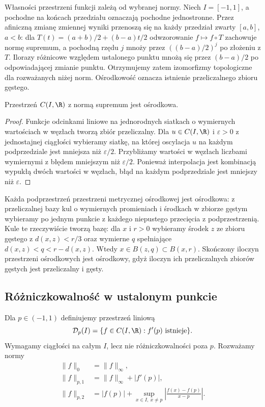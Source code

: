 Własności przestrzeni funkcji zależą od wybranej normy.
Niech $I=[-1,1]$, a pochodne na końcach przedziału
oznaczają pochodne jednostronne. Przez afiniczną zmianę
zmiennej wyniki przenoszą się na każdy przedział
zwarty $[a,b]$, $a<b$: dla
$T(t)=(a+b)/2+(b-a)t/2$ odwzorowanie $f\mapsto f\circ T$
zachowuje normę supremum, a pochodną rzędu $j$
mnoży przez $( (b-a)/2)^j$ po złożeniu z $T$.
Ilorazy różnicowe względem ustalonego punktu
mnożą się przez $(b-a)/2$ po odpowiadającej zmianie
punktu. Otrzymujemy zatem izomorfizmy topologiczne
dla rozważanych niżej norm.
Ośrodkowość oznacza istnienie
przeliczalnego zbioru gęstego.

\begin{lemat}
\label{ma2:lem:continuous-separable}
Przestrzeń $C(I,\R)$ z normą supremum jest ośrodkowa.
\end{lemat}
\begin{proof}
Funkcje odcinkami liniowe na jednorodnych siatkach
o wymiernych wartościach w węzłach tworzą zbiór
przeliczalny. Dla $u\in C(I,\R)$ i $\varepsilon>0$
z jednostajnej ciągłości wybieramy siatkę, na której
oscylacja $u$ na każdym podprzedziale jest mniejsza
niż $\varepsilon/2$. Przybliżamy wartości w węzłach
liczbami wymiernymi z błędem mniejszym niż
$\varepsilon/2$. Ponieważ interpolacja jest kombinacją
wypukłą dwóch wartości w węzłach, błąd na każdym
podprzedziale jest mniejszy niż $\varepsilon$.
\end{proof}

Każda podprzestrzeń przestrzeni metrycznej ośrodkowej
jest ośrodkowa: z przeliczalnej bazy kul o wymiernych
promieniach i środkach w zbiorze gęstym wybieramy po
jednym punkcie z każdego niepustego przecięcia
z podprzestrzenią. Kule te rzeczywiście tworzą bazę:
dla $x$ i $r>0$ wybieramy środek $z$ ze zbioru gęstego
z $d(x,z)<r/3$ oraz wymierne $q$ spełniające
$d(x,z)<q<r-d(x,z)$. Wtedy $x\in B(z,q)\subset B(x,r)$. Skończony iloczyn przestrzeni
ośrodkowych jest ośrodkowy, gdyż iloczyn ich
przeliczalnych zbiorów gęstych jest przeliczalny i gęsty.

\subsection{Różniczkowalność w ustalonym punkcie}

\begin{definicja}
\label{ma2:def:point-differentiable-space}
Dla $p\in(-1,1)$ definiujemy przestrzeń liniową
\[
 \mathcal D_p(I)=\{f\in C(I,\R):f'(p)\text{ istnieje}\}.
\]
Wymagamy ciągłości na całym $I$, lecz nie
różniczkowalności poza $p$. Rozważamy normy
\[
 \begin{aligned}
 \|f\|_0&=\|f\|_\infty,\\
 \|f\|_{p,1}&=\|f\|_\infty+|f'(p)|,\\
 \|f\|_{p,2}&=|f(p)|+\sup_{x\in I,\ x\ne p}
              \left|\frac{f(x)-f(p)}{x-p}\right|.
 \end{aligned}
\]
\end{definicja}

